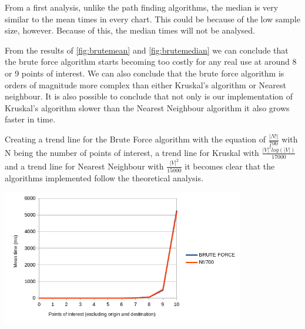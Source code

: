 \documentclass[a4paper, 12pt]{report}
\begin{document}
    From a first analysis, unlike the path finding algorithms, the median is very similar to the mean times in every chart. This could be because of the low sample size, however. Because of this, the median times will not be analysed.
    
    From the results of \ref{fig:brutemean} and \ref{fig:brutemedian} we can conclude that the brute force algorithm starts becoming too costly for any real use at around 8 or 9 points of interest. We can also conclude that the brute force algorithm is orders of magnitude more complex than either Kruskal's algorithm or Nearest neighbour. It is also possible to conclude that not only is our implementation of Kruskal's algorithm slower than the Nearest Neighbour algorithm it also grows faster in time.
    
    Creating a trend line for the Brute Force algorithm with the equation of $\frac{|N!|}{700}$ with N being the number of points of interest, a trend line for Kruskal with $\frac{|V|^2log(|V|)}{17000}$ and a trend line for Nearest Neighbour with $\frac{|V|^2}{15000}$ it becomes clear that the algorithms implemented follow the theoretical analysis.
    
    \begin{center}
        \includegraphics[width = 400px]{img/bruteforcetrend.png}
        \label{fig:brutetrend}
    \end{center}
    
\end{document}
